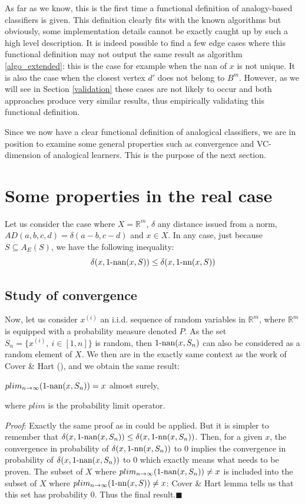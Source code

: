 As far as we know, this is the first time a functional definition of
analogy-based classifiers is given. This definition clearly fits with the known
algorithms but obviously, some implementation details cannot be exactly caught
up by such a high level description. It is indeed possible to find a few edge
cases where this functional definition may not output the same result as
algorithm \ref{algo_extended}: this is the case for example when the nan of $x$
is not unique. It is
also the case when the closest vertex $d'$ does not belong to $B^m$.  However,
as we will see in Section \ref{validation} these cases are not likely to occur
and both approaches produce very similar results, thus empirically validating
this functional definition.

Since we now have a clear functional definition of analogical classifiers, we
are in position to examine some general properties such as convergence and
VC-dimension of analogical learners. This is the purpose of the next section.

\section{Some properties in the real case}\label{convergence}
Let us consider the case where $X=\mathbb{R}^m$, $\delta$ any distance issued
from a norm, $AD(a,b,c,d)=\delta(a-b,c-d)$ and $x \in X$.  In any case, just
because $S \subseteq A_E(S)$, we have the following inequality:
$$\delta(x, 1\mbox{-nan}(x,S)) \leq \delta(x, 1\mbox{-nn}(x,S))$$

\subsection{Study of convergence}

Now, let us consider  $x^{(i)}$ an i.i.d. sequence of random variables in
$\mathbb{R}^m$, where $\mathbb{R}^m$ is equipped with a probability measure
denoted $P$. As the set $S_n=\{x^{(i)}, ~ i \in [1, n]\}$ is random, then
$1\mbox{-nan}(x,S_n)$ can also be considered as a random element of $X$.  We then are
in the exactly same context as the work of Cover \& Hart (\cite{CovHarTIT67}), and
we obtain the same result:
\begin{property}\label{propconvergence}
$plim_{n \to \infty}(1\mbox{-nan}(x,S_n))=x$ almost surely,
\end{property}
where $plim$ is the probability limit operator.

{\it Proof}:
Exactly the same proof  as in \cite{CovHarTIT67} could be applied.  But it is
simpler to remember that $\delta(x, 1\mbox{-nan}(x,S_n)) \leq \delta(x, 1\mbox{-nn}(x,S_n))$. Then,
for a given $x$, the convergence in probability of $\delta(x,
1\mbox{-nn}(x,S_n))$ to $0$ implies the convergence in probability of $\delta(x,
1\mbox{-nan}(x,S_n))$ to $0$ which exactly means what needs to be proven.
The subset of $X$ where $plim_{n \to \infty}(1\mbox{-nan}(x,S_n))\neq
x$ is included into the subset of $X$ where $plim_{n \to \infty}(1\mbox{-nn}(x,S))\neq x$:
Cover \& Hart lemma tells us that this set has probability $0$. Thus the final
result.\hfill $\blacksquare$\\

